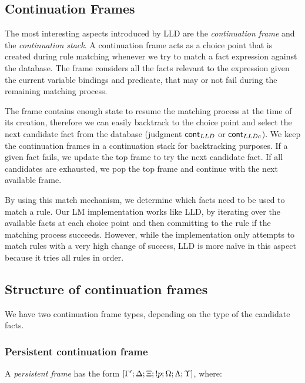 \subsection{Continuation Frames}

The most interesting aspects introduced by LLD are the \emph{continuation frame}
and the \emph{continuation stack}. A continuation frame acts as a choice point
that is created during rule matching whenever we try to match a fact expression
against the database.  The frame considers all the facts relevant to the
expression given the current variable bindings and predicate, that may or not
fail during the remaining matching process.

The frame contains enough state to resume the matching process at the time of
its creation, therefore we can easily backtrack to the choice point and select
the next candidate fact from the database (judgment $\mathsf{cont}_{LLD}$ or $\mathsf{cont}_{LLDc}$).
We keep the continuation frames in a continuation stack for backtracking
purposes. If a given fact fails, we update the top frame to try the next
candidate fact. If all candidates are exhausted, we pop the top frame and
continue with the next available frame.

By using this match mechanism, we determine which facts need to be used to match
a rule.  Our LM implementation works like LLD, by iterating over the available
facts at each choice point and then committing to the rule if the matching
process succeeds. However, while the implementation only attempts to match rules
with a very high change of success, LLD is more na\"{i}ve in this aspect because
it tries all rules in order.

\subsection{Structure of continuation frames}

We have two continuation frame types, depending on the type of the candidate
facts.

\subsubsection{Persistent continuation frame}

A \emph{persistent frame} has the form $[\Gamma'; \Delta; \Xi; {!} p; \Omega;
\Lambda; \Upsilon]$, where:

